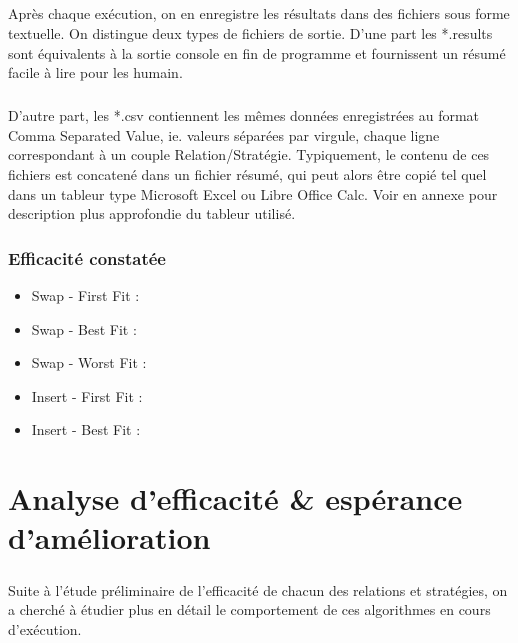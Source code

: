 \documentclass[a4paper,10pt]{report}
\begin{document}
\paragraph{}
  Après chaque exécution, on en enregistre les résultats dans des fichiers sous forme textuelle. On distingue deux
types de fichiers de sortie. D'une part les *.results sont équivalents à la sortie console en fin de programme et
fournissent un résumé facile à lire pour les humain.
\paragraph{}
  D'autre part, les *.csv contiennent les mêmes données enregistrées au format Comma Separated Value, ie. valeurs
séparées par virgule, chaque ligne correspondant à un couple Relation/Stratégie. Typiquement, le contenu de ces 
fichiers est concatené dans un fichier résumé, qui peut alors être copié tel quel dans un tableur type Microsoft
Excel ou Libre Office Calc. Voir en annexe pour description plus approfondie du tableur utilisé.
  

\subsection{Efficacité constatée}
\begin{itemize}
 \item Swap - First Fit : 
 \item Swap - Best Fit : 
 \item Swap - Worst Fit : 
 \item Insert - First Fit :
 \item Insert - Best Fit :
\end{itemize}


\chapter{Analyse d'efficacité \& espérance d'amélioration}

\paragraph{}
  Suite à l'étude préliminaire de l'efficacité de chacun des relations et stratégies, on a cherché à étudier
plus en détail le comportement de ces algorithmes en cours d'exécution.
\end{document}
